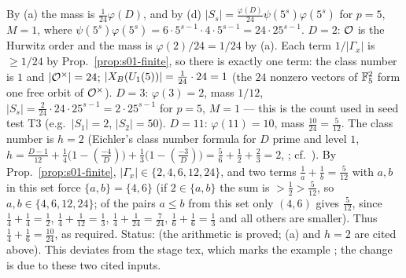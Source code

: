 \begin{example}[checks]\label{ex:s01-masschecks}
By (a) the mass is $\frac{1}{24}\varphi(D)$, and by (d) $|S_s|=\frac{\varphi(D)}{24}\psi(5^s)\varphi(5^s)$ for $p=5$, $M=1$, where
$\psi(5^s)\varphi(5^s)=6\cdot5^{s-1}\cdot4\cdot5^{s-1}=24\cdot25^{s-1}$.
$D=2$: $\mathcal{O}$ is the Hurwitz order and the mass is $\varphi(2)/24=1/24$ by (a). Each term $1/|\Gamma_x|$ is $\ge1/24$
by Prop.~\ref{prop:s01-finite}, so there is exactly one term: the class number is $1$ and $|\mathcal{O}^\times|=24$; $|X_B(U_1(5))|=\frac1{24}\cdot24=1$ (the $24$ nonzero vectors of $\mathbb{F}_5^2$
form one free orbit of $\mathcal{O}^\times$). $D=3$: $\varphi(3)=2$, mass $1/12$, $|S_s|=\frac{2}{24}\cdot24\cdot25^{s-1}=2\cdot25^{s-1}$ for
$p=5$, $M=1$ --- this is the count used in seed test T3 (e.g.\ $|S_1|=2$, $|S_2|=50$). $D=11$: $\varphi(11)=10$, mass $\frac{10}{24}=\frac5{12}$. The class number is $h=2$
(Eichler's class number formula for $D$ prime and level $1$, $h=\frac{D-1}{12}+\frac14\bigl(1-(\frac{-4}{D})\bigr)+\frac13\bigl(1-(\frac{-3}{D})\bigr)=\frac56+\frac12+\frac23=2$, \stcited{}
; cf.\ ). By
Prop.~\ref{prop:s01-finite}, $|\Gamma_x|\in\{2,4,6,12,24\}$, and two terms $\frac1a+\frac1b=\frac5{12}$ with $a,b$ in this set force $\{a,b\}=\{4,6\}$
(if $2\in\{a,b\}$ the sum is $>\frac12>\frac5{12}$, so $a,b\in\{4,6,12,24\}$; of the pairs $a\le b$ from this set only
$(4,6)$ gives $\frac5{12}$, since $\frac14+\frac14=\frac12$, $\frac14+\frac1{12}=\frac13$, $\frac14+\frac1{24}=\frac7{24}$, $\frac16+\frac16=\frac13$ and all others are smaller). Thus $\frac14+\frac16=\frac{10}{24}$, as required.
Status: \stpmc{} (the arithmetic is proved; (a) and $h=2$ are cited above). This deviates from the stage tex, which marks
the example \stproved; the change is due to these two cited inputs.
\end{example}

